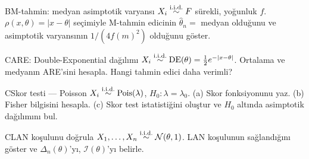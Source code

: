 \begin{alistirma}[Al.18.3]{B}{M-tahmin: medyan asimptotik varyansı}
$X_i\overset{\text{i.i.d.}}{\sim} F$ sürekli, yoğunluk $f$. $\rho(x,\theta)=|x-\theta|$ seçimiyle M-tahmin edicinin $\hat\theta_n = $ medyan olduğunu ve asimptotik varyansının $1/(4f(m)^2)$ olduğunu göster.
\end{alistirma}

\begin{alistirma}[Al.18.4]{C}{ARE: Double-Exponential dağılımı}
$X_i\overset{\text{i.i.d.}}{\sim}\mathrm{DE}(\theta)=\frac{1}{2}e^{-|x-\theta|}$. Ortalama ve medyanın ARE'sini hesapla. Hangi tahmin edici daha verimli?
\end{alistirma}

\begin{alistirma}[Al.18.5a]{C}{Skor testi --- Poisson}
$X_i\overset{\text{i.i.d.}}{\sim}\mathrm{Pois}(\lambda)$, $H_0:\lambda=\lambda_0$. (a) Skor fonksiyonunu yaz. (b) Fisher bilgisini hesapla. (c) Skor test istatistiğini oluştur ve $H_0$ altında asimptotik dağılımını bul.
\end{alistirma}

\begin{alistirma}[Al.18.5]{C}{LAN koşulunu doğrula}
$X_1,\ldots,X_n\overset{\text{i.i.d.}}{\sim}\mathcal{N}(\theta,1)$. LAN koşulunun sağlandığını göster ve $\Delta_n(\theta)$'yı, $\mathcal{I}(\theta)$'yı belirle.
\end{alistirma}

